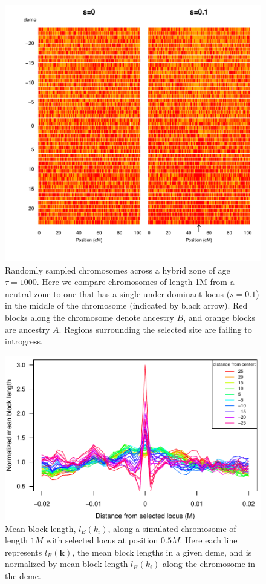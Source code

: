 \documentclass[11pt,letterpaper]{article}
\begin{document}
\begin{figure}
\includegraphics[width=\textwidth]{figs/plot_chromosomes_tau1000}
\caption{Randomly sampled chromosomes  across a hybrid zone of age $\tau=1000$. Here we compare chromosomes of length 1M from a neutral zone to one that has a single under-dominant locus ($s=0.1$) in the middle of the chromosome (indicated by black arrow). Red blocks along the chromosome denote ancestry $B$, and orange blocks are ancestry $A$. Regions surrounding the selected site are failing to introgress.
 }\label{Fig:resistanceToIntrogression1000g}
\end{figure}

\begin{figure}
\includegraphics{figs/blocksAlongChromAncBConditioning}
\caption{Mean block length, $l_B(k_i)$, along a simulated chromosome of length $1M$ with selected locus at position $0.5M$. Here each line represents  $l_B(\mathbf{k})$, the mean block lengths in a given deme, and is normalized by mean block length $l_B(k_i)$ along the chromosome in the deme.}\label{Fig:blockLengths}
\end{figure}
\end{document}
